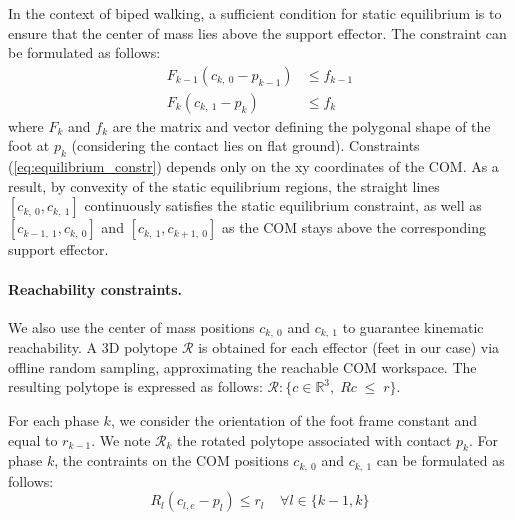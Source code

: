 In the context of biped walking, a sufficient condition for static equilibrium is to ensure that the center of mass lies above the support effector.
The constraint can be formulated as follows:
\begin{equation}
    \label{eq:equilibrium_constr}
    \begin{aligned}
        F_{k-1} (c_{k,\:0}-p_{k-1}) &\leq  f_{k-1}\\%
        F_{k} (c_{k,\:1}-p_{k}) &\leq  f_{k}%
    \end{aligned}
\end{equation}
where $F_k$ and $f_k$ are the matrix and vector defining the polygonal shape of the foot at $p_k$ (considering the contact lies on flat ground).
Constraints (\ref{eq:equilibrium_constr}) depends only on the xy coordinates of the COM.
As a result, by convexity of the static equilibrium regions, the straight lines $[c_{k,\:0}, c_{k,\:1}]$ continuously satisfies the static equilibrium
constraint, as well as $[c_{k-1,\:1}, c_{k,\:0}]$ and $[c_{k,\:1}, c_{k+1,\:0}]$ as the COM stays above the corresponding support effector.

\paragraph{Reachability constraints.}
We also use the center of mass positions $c_{k,\:0}$ and $c_{k,\:1}$ to guarantee kinematic reachability.
A 3D polytope $\mathcal{R}$ is obtained for each effector (feet in our case) via offline random sampling, approximating the reachable COM workspace.
The resulting polytope is expressed as follows: $\mathcal{R} : \{c \in \mathbb{R}^3 , \; \! R c \; \leq \; \! r\}$.

For each phase $k$, we consider the orientation of the foot frame constant and equal to $r_{k-1}$.
We note $\mathcal{R}_k$ the rotated polytope associated with contact $p_{k}$.
For phase $k$, the contraints on the COM positions $c_{k,\:0}$ and $c_{k,\:1}$ can be formulated as follows:
\begin{equation}
    R_{l} (c_{l,e} - p_{l}) \leq r_l \;\;\;\; \forall l \in \{k-1,k\}
\end{equation}

